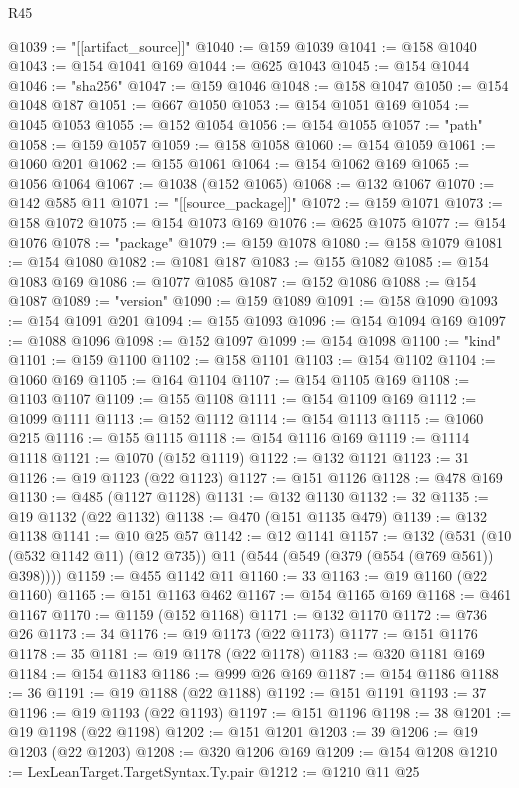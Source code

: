 \begin{lexlean}{R45}
\begin{coremodule}
@1039 := "[[artifact_source]]"
@1040 := @159 @1039
@1041 := @158 @1040
@1043 := @154 @1041 @169
@1044 := @625 @1043
@1045 := @154 @1044
@1046 := "sha256"
@1047 := @159 @1046
@1048 := @158 @1047
@1050 := @154 @1048 @187
@1051 := @667 @1050
@1053 := @154 @1051 @169
@1054 := @1045 @1053
@1055 := @152 @1054
@1056 := @154 @1055
@1057 := "path"
@1058 := @159 @1057
@1059 := @158 @1058
@1060 := @154 @1059
@1061 := @1060 @201
@1062 := @155 @1061
@1064 := @154 @1062 @169
@1065 := @1056 @1064
@1067 := @1038 (@152 @1065)
@1068 := @132 @1067
@1070 := @142 @585 @11
@1071 := "[[source_package]]"
@1072 := @159 @1071
@1073 := @158 @1072
@1075 := @154 @1073 @169
@1076 := @625 @1075
@1077 := @154 @1076
@1078 := "package"
@1079 := @159 @1078
@1080 := @158 @1079
@1081 := @154 @1080
@1082 := @1081 @187
@1083 := @155 @1082
@1085 := @154 @1083 @169
@1086 := @1077 @1085
@1087 := @152 @1086
@1088 := @154 @1087
@1089 := "version"
@1090 := @159 @1089
@1091 := @158 @1090
@1093 := @154 @1091 @201
@1094 := @155 @1093
@1096 := @154 @1094 @169
@1097 := @1088 @1096
@1098 := @152 @1097
@1099 := @154 @1098
@1100 := "kind"
@1101 := @159 @1100
@1102 := @158 @1101
@1103 := @154 @1102
@1104 := @1060 @169
@1105 := @164 @1104
@1107 := @154 @1105 @169
@1108 := @1103 @1107
@1109 := @155 @1108
@1111 := @154 @1109 @169
@1112 := @1099 @1111
@1113 := @152 @1112
@1114 := @154 @1113
@1115 := @1060 @215
@1116 := @155 @1115
@1118 := @154 @1116 @169
@1119 := @1114 @1118
@1121 := @1070 (@152 @1119)
@1122 := @132 @1121
@1123 := 31
@1126 := @19 @1123 (@22 @1123)
@1127 := @151 @1126
@1128 := @478 @169
@1130 := @485 (@1127 @1128)
@1131 := @132 @1130
@1132 := 32
@1135 := @19 @1132 (@22 @1132)
@1138 := @470 (@151 @1135 @479)
@1139 := @132 @1138
@1141 := @10 @25 @57
@1142 := @12 @1141
@1157 := @132
    (@531 (@10 (@532 @1142 @11) (@12 @735)) @11 (@544 (@549 (@379 (@554 (@769 @561)) @398))))
@1159 := @455 @1142 @11
@1160 := 33
@1163 := @19 @1160 (@22 @1160)
@1165 := @151 @1163 @462
@1167 := @154 @1165 @169
@1168 := @461 @1167
@1170 := @1159 (@152 @1168)
@1171 := @132 @1170
@1172 := @736 @26
@1173 := 34
@1176 := @19 @1173 (@22 @1173)
@1177 := @151 @1176
@1178 := 35
@1181 := @19 @1178 (@22 @1178)
@1183 := @320 @1181 @169
@1184 := @154 @1183
@1186 := @999 @26 @169
@1187 := @154 @1186
@1188 := 36
@1191 := @19 @1188 (@22 @1188)
@1192 := @151 @1191
@1193 := 37
@1196 := @19 @1193 (@22 @1193)
@1197 := @151 @1196
@1198 := 38
@1201 := @19 @1198 (@22 @1198)
@1202 := @151 @1201
@1203 := 39
@1206 := @19 @1203 (@22 @1203)
@1208 := @320 @1206 @169
@1209 := @154 @1208
@1210 := LexLeanTarget.TargetSyntax.Ty.pair
@1212 := @1210 @11 @25

\end{coremodule}
\end{lexlean}
